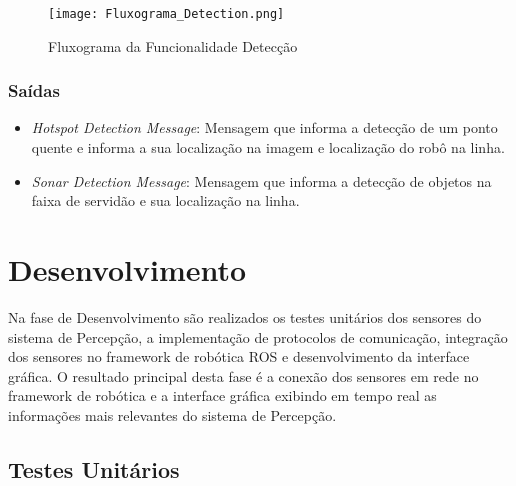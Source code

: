 \begin{figure}[!ht]
	\centering
	\texttt{[image: Fluxograma\_Detection.png]}
	\caption{Fluxograma da Funcionalidade Detecção} \label{FuncDetec}
\end{figure}

\subsubsection{Saídas}

\begin{itemize}
	\item \textit{Hotspot Detection Message}: Mensagem que informa a detecção de um ponto quente e informa a sua localização na imagem e localização do robô na linha.
	\item \textit{Sonar Detection Message}: Mensagem que informa a detecção de objetos na faixa de servidão e sua localização na linha.
\end{itemize}
	
	\section{Desenvolvimento}
	Na fase de Desenvolvimento são realizados os testes unitários dos sensores do sistema de Percepção, a implementação de protocolos de comunicação, integração dos sensores no framework de robótica ROS e desenvolvimento da interface gráfica. O resultado principal desta fase é a conexão dos sensores em rede no framework de robótica e a interface gráfica exibindo em tempo real as informações mais relevantes do sistema de Percepção.
	
	\subsection{Testes Unitários}
	
